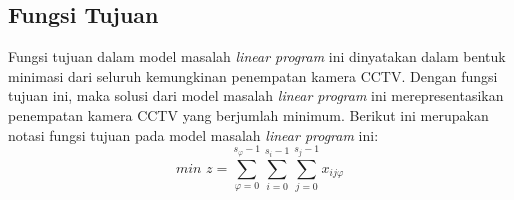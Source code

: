 
\subsection{Fungsi Tujuan}
Fungsi tujuan dalam model masalah \textit{linear program} ini dinyatakan dalam bentuk minimasi dari seluruh kemungkinan penempatan kamera CCTV. Dengan fungsi tujuan ini, maka solusi dari model masalah \textit{linear program} ini merepresentasikan penempatan kamera CCTV yang berjumlah minimum. Berikut ini merupakan notasi fungsi tujuan pada model masalah \textit{linear program} ini:
\begin{equation}
\textit{min }z = \sum_{\varphi=0}^{s_{\varphi}-1} \sum_{i=0}^{s_i-1} \sum_{j=0}^{s_j-1} x_{ij\varphi}
\end{equation}


